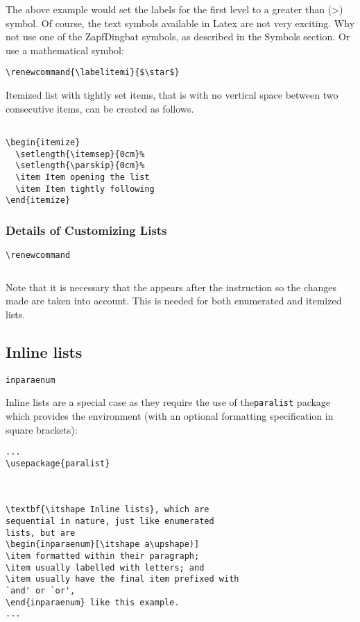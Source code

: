 The above example would set the labels for the first level to a greater than
(>) symbol. Of course, the text symbols available in Latex are not very
exciting. Why not use one of the ZapfDingbat symbols, as described in
the Symbols section.
Or use a mathematical symbol:
\begin{lstlisting}
\renewcommand{\labelitemi}{$\star$}
\end{lstlisting}

Itemized list with tightly set items, that is with no vertical space between
two consecutive items, can be created as follows.
\begin{lstlisting}

\begin{itemize}
  \setlength{\itemsep}{0cm}%
  \setlength{\parskip}{0cm}%
  \item Item opening the list
  \item Item tightly following
\end{itemize}
\end{lstlisting}

\subsubsection{Details of Customizing Lists}
\begin{lstlisting}
\renewcommand
\end{lstlisting}
\begin{lstlisting}

\end{lstlisting}
Note that it is necessary that the  appears after the  instruction so the
changes made are taken into account. This is needed for both enumerated and
itemized lists.

\subsection{Inline lists}
 \begin{lstlisting}
inparaenum
\end{lstlisting}
Inline lists are a special case as they require the use of the\texttt{paralist}
package which provides the  environment (with an optional formatting
specification in square brackets):

\begin{lstlisting}
...
\usepackage{paralist}



\textbf{\itshape Inline lists}, which are
sequential in nature, just like enumerated
lists, but are
\begin{inparaenum}[\itshape a\upshape)]
\item formatted within their paragraph;
\item usually labelled with letters; and 
\item usually have the final item prefixed with
`and' or `or',
\end{inparaenum} like this example.
...

\end{lstlisting}

